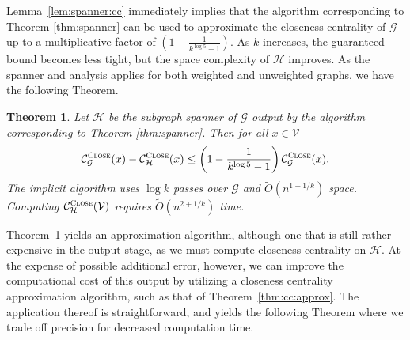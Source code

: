 \documentclass{report}
\newtheorem{theorem}{Theorem}[section]
\newcommand{\algoname}[1]{\textnormal{\textsc{#1}}}
\begin{document}
Lemma~\ref{lem:spanner:cc} immediately implies that the algorithm corresponding to Theorem \ref{thm:spanner} can be used to approximate the closeness centrality of $\mathcal{G}$ up to a multiplicative factor of $\left ( 1- \frac{1}{k^{\log 5} - 1} \right )$.
As $k$ increases, the guaranteed bound becomes less tight, but the space complexity of $\mathcal{H}$ improves. 
As the spanner and analysis applies for both weighted and unweighted graphs, we have the following Theorem.

%
\begin{theorem} \label{thm:cc:sstream:approx:heavy}
Let $\mathcal{H}$ be the subgraph spanner of $\mathcal{G}$ output by the algorithm corresponding to Theorem \ref{thm:spanner}.
Then for all $x \in \mathcal{V}$
%
\begin{equation} \label{eq:spanner:cc}
\mathcal{C}^{\algoname{Close}}_{\mathcal{G}}(x) - \mathcal{C}^{\algoname{Close}}_{\mathcal{H}}(x) \leq \left ( 1 - \frac{1}{k^{\log 5} - 1} \right ) \mathcal{C}^{\algoname{Close}}_{\mathcal{G}}(x).
\end{equation}
%
The implicit algorithm uses $\log k$ passes over $\mathcal{G}$ and $\widetilde{O}(n^{1 + 1/k})$ space.
Computing $\mathcal{C}^{\algoname{Close}}_{\mathcal{H}}(\mathcal{V})$ requires $\widetilde{O}(n^{2 + 1/k})$ time.
\end{theorem}




Theorem~\ref{thm:cc:sstream:approx:heavy} yields an approximation algorithm, although one that is still rather expensive in the output stage, as we must compute closeness centrality on $\mathcal{H}$. 
At the expense of possible additional error, however, we can improve the computational cost of this output by utilizing a closeness centrality approximation algorithm, such as that of Theorem~\ref{thm:cc:approx}.
The application thereof is straightforward, and yields the following Theorem where we trade off precision for decreased computation time.
\end{document}
